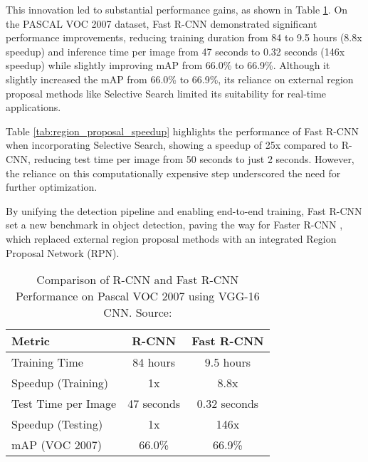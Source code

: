 \documentclass[3p,times]{elsarticle}
\begin{document}
This innovation led to substantial performance gains, as shown in Table \ref{tab:fast_rcnn_results}. On the PASCAL VOC 2007 dataset, Fast R-CNN demonstrated significant performance improvements, reducing training duration from 84 to 9.5 hours \cite{girshick2015fastrcnn} (8.8x speedup) and inference time per image from 47 seconds to 0.32 seconds (146x speedup) while slightly improving mAP from 66.0\% to 66.9\%. Although it slightly increased the mAP from 66.0\% to 66.9\%, its reliance on external region proposal methods like Selective Search limited its suitability for real-time applications.

Table \ref{tab:region_proposal_speedup} highlights the performance of Fast R-CNN when incorporating Selective Search, showing a speedup of 25x compared to R-CNN, reducing test time per image from 50 seconds to just 2 seconds. However, the reliance on this computationally expensive step underscored the need for further optimization.

By unifying the detection pipeline and enabling end-to-end training, Fast R-CNN set a new benchmark in object detection, paving the way for Faster R-CNN \citet{ren2016fasterrcnnrealtimeobject}, which replaced external region proposal methods with an integrated Region Proposal Network (RPN).
\begin{table}[H]
\centering
\caption{Comparison of R-CNN and Fast R-CNN Performance on Pascal VOC 2007 using VGG-16 CNN. Source: \cite{girshick2015fastrcnn}}
\label{tab:fast_rcnn_results}
\begin{tabular}{|l|c|c|}
\hline
\textbf{Metric}              & \textbf{R-CNN}     & \textbf{Fast R-CNN} \\ \hline
Training Time                & 84 hours          & 9.5 hours           \\ \hline
Speedup (Training)           & 1x                & 8.8x                \\ \hline
Test Time per Image          & 47 seconds        & 0.32 seconds        \\ \hline
Speedup (Testing)            & 1x                & 146x                \\ \hline
mAP (VOC 2007)               & 66.0\%            & 66.9\%              \\ \hline
\end{tabular}
\end{table}
\end{document}
